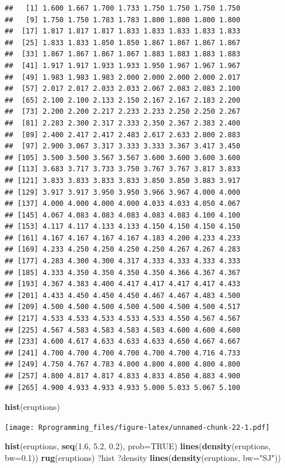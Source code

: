 \documentclass[11pt,]{krantz}
\makeatletter
\newenvironment{Shaded}{\begin{snugshade}}{\end{snugshade}}
\newcommand{\KeywordTok}[1]{\textcolor[rgb]{0.13,0.29,0.53}{\textbf{#1}}}
\newcommand{\DataTypeTok}[1]{\textcolor[rgb]{0.13,0.29,0.53}{#1}}
\newcommand{\FloatTok}[1]{\textcolor[rgb]{0.00,0.00,0.81}{#1}}
\newcommand{\StringTok}[1]{\textcolor[rgb]{0.31,0.60,0.02}{#1}}
\newcommand{\OtherTok}[1]{\textcolor[rgb]{0.56,0.35,0.01}{#1}}
\newcommand{\NormalTok}[1]{#1}
\newenvironment{kframe}{%
\medskip{}
\setlength{\fboxsep}{.8em}
 \def\at@end@of@kframe{}%
 \ifinner\ifhmode%
  \def\at@end@of@kframe{\end{minipage}}%
  \begin{minipage}{\columnwidth}%
 \fi\fi%
 \def\FrameCommand##1{\hskip\@totalleftmargin \hskip-\fboxsep
 \colorbox{shadecolor}{##1}\hskip-\fboxsep
     \hskip-\linewidth \hskip-\@totalleftmargin \hskip\columnwidth}%
 \MakeFramed {\advance\hsize-\width
   \@totalleftmargin\z@ \linewidth\hsize
   \@setminipage}}%
 {\par\unskip\endMakeFramed%
 \at@end@of@kframe}
\renewenvironment{Shaded}{\begin{kframe}}{\end{kframe}}
\theoremstyle{definition}
\theoremstyle{definition}
\theoremstyle{remark}
\makeatother
\begin{document}
\begin{verbatim}
##   [1] 1.600 1.667 1.700 1.733 1.750 1.750 1.750 1.750
##   [9] 1.750 1.750 1.783 1.783 1.800 1.800 1.800 1.800
##  [17] 1.817 1.817 1.817 1.833 1.833 1.833 1.833 1.833
##  [25] 1.833 1.833 1.850 1.850 1.867 1.867 1.867 1.867
##  [33] 1.867 1.867 1.867 1.867 1.883 1.883 1.883 1.883
##  [41] 1.917 1.917 1.933 1.933 1.950 1.967 1.967 1.967
##  [49] 1.983 1.983 1.983 2.000 2.000 2.000 2.000 2.017
##  [57] 2.017 2.017 2.033 2.033 2.067 2.083 2.083 2.100
##  [65] 2.100 2.100 2.133 2.150 2.167 2.167 2.183 2.200
##  [73] 2.200 2.200 2.217 2.233 2.233 2.250 2.250 2.267
##  [81] 2.283 2.300 2.317 2.333 2.350 2.367 2.383 2.400
##  [89] 2.400 2.417 2.417 2.483 2.617 2.633 2.800 2.883
##  [97] 2.900 3.067 3.317 3.333 3.333 3.367 3.417 3.450
## [105] 3.500 3.500 3.567 3.567 3.600 3.600 3.600 3.600
## [113] 3.683 3.717 3.733 3.750 3.767 3.767 3.817 3.833
## [121] 3.833 3.833 3.833 3.833 3.850 3.850 3.883 3.917
## [129] 3.917 3.917 3.950 3.950 3.966 3.967 4.000 4.000
## [137] 4.000 4.000 4.000 4.000 4.033 4.033 4.050 4.067
## [145] 4.067 4.083 4.083 4.083 4.083 4.083 4.100 4.100
## [153] 4.117 4.117 4.133 4.133 4.150 4.150 4.150 4.150
## [161] 4.167 4.167 4.167 4.167 4.183 4.200 4.233 4.233
## [169] 4.233 4.250 4.250 4.250 4.250 4.267 4.267 4.283
## [177] 4.283 4.300 4.300 4.317 4.333 4.333 4.333 4.333
## [185] 4.333 4.350 4.350 4.350 4.350 4.366 4.367 4.367
## [193] 4.367 4.383 4.400 4.417 4.417 4.417 4.417 4.433
## [201] 4.433 4.450 4.450 4.450 4.467 4.467 4.483 4.500
## [209] 4.500 4.500 4.500 4.500 4.500 4.500 4.500 4.517
## [217] 4.533 4.533 4.533 4.533 4.533 4.550 4.567 4.567
## [225] 4.567 4.583 4.583 4.583 4.583 4.600 4.600 4.600
## [233] 4.600 4.617 4.633 4.633 4.633 4.650 4.667 4.667
## [241] 4.700 4.700 4.700 4.700 4.700 4.700 4.716 4.733
## [249] 4.750 4.767 4.783 4.800 4.800 4.800 4.800 4.800
## [257] 4.800 4.817 4.817 4.833 4.833 4.850 4.883 4.900
## [265] 4.900 4.933 4.933 4.933 5.000 5.033 5.067 5.100
\end{verbatim}

\begin{Shaded}
\begin{Highlighting}[]
\KeywordTok{hist}\NormalTok{(eruptions)}
\end{Highlighting}
\end{Shaded}

\texttt{[image: Rprogramming\_files/figure-latex/unnamed-chunk-22-1.pdf]}

\begin{Shaded}
\begin{Highlighting}[]
\KeywordTok{hist}\NormalTok{(eruptions, }\KeywordTok{seq}\NormalTok{(}\FloatTok{1.6}\NormalTok{, }\FloatTok{5.2}\NormalTok{, }\FloatTok{0.2}\NormalTok{), }\DataTypeTok{prob=}\OtherTok{TRUE}\NormalTok{)}
\KeywordTok{lines}\NormalTok{(}\KeywordTok{density}\NormalTok{(eruptions, }\DataTypeTok{bw=}\FloatTok{0.1}\NormalTok{))}
\KeywordTok{rug}\NormalTok{(eruptions)}
\NormalTok{?hist}
\NormalTok{?density}
\KeywordTok{lines}\NormalTok{(}\KeywordTok{density}\NormalTok{(eruptions, }\DataTypeTok{bw=}\StringTok{"SJ"}\NormalTok{))}
\end{Highlighting}
\end{Shaded}
\end{document}
